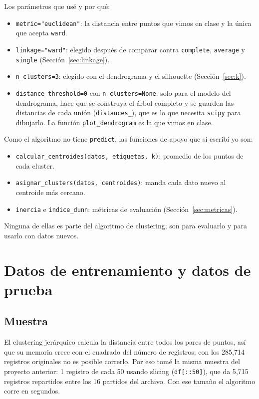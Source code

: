 \documentclass[11pt,a4paper]{article}
\begin{document}
Los parámetros que usé y por qué:

\begin{itemize}
  \item \texttt{metric="euclidean"}: la distancia entre puntos que vimos en clase y la única que acepta \texttt{ward}.
  \item \texttt{linkage="ward"}: elegido después de comparar contra \texttt{complete}, \texttt{average} y \texttt{single} (Sección~\ref{sec:linkage}).
  \item \texttt{n\_clusters=3}: elegido con el dendrograma y el silhouette (Sección~\ref{sec:k}).
  \item \texttt{distance\_threshold=0} con \texttt{n\_clusters=None}: solo para el modelo del dendrograma, hace que se construya el árbol completo y se guarden las distancias de cada unión (\texttt{distances\_}), que es lo que necesita \texttt{scipy} para dibujarlo. La función \texttt{plot\_dendrogram} es la que vimos en clase.
\end{itemize}

Como el algoritmo no tiene \texttt{predict}, las funciones de apoyo que sí escribí yo son:

\begin{itemize}
  \item \texttt{calcular\_centroides(datos, etiquetas, k)}: promedio de los puntos de cada cluster.
  \item \texttt{asignar\_clusters(datos, centroides)}: manda cada dato nuevo al centroide más cercano.
  \item \texttt{inercia} e \texttt{indice\_dunn}: métricas de evaluación (Sección~\ref{sec:metricas}).
\end{itemize}

Ninguna de ellas es parte del algoritmo de clustering; son para evaluarlo y para usarlo con datos nuevos.

\section{Datos de entrenamiento y datos de prueba}

\subsection{Muestra}

El clustering jerárquico calcula la distancia entre todos los pares de puntos, así que su memoria crece con el cuadrado del número de registros; con los 285{,}714 registros originales no es posible correrlo. Por eso tomé la misma muestra del proyecto anterior: 1 registro de cada 50 usando slicing (\texttt{df[::50]}), que da 5{,}715 registros repartidos entre los 16 partidos del archivo. Con ese tamaño el algoritmo corre en segundos.
\end{document}
